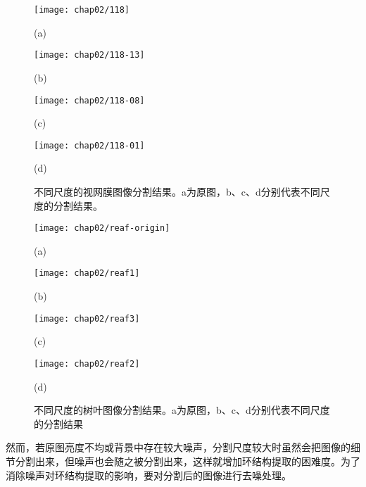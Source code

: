 \begin{figure}
\centering
  \begin{minipage}[b]{0.48\textwidth} 
      \centering 
      \texttt{[image: chap02/118]}
        \centerline{(a)}\medskip
  \label{Segmentaion-retinal:a}
    \end{minipage}
  \begin{minipage}[b]{0.48\textwidth}
    \centering
    \texttt{[image: chap02/118-13]}
      \centerline{(b)}\medskip
   \label{Segmentaion-retinal:b}
  \end{minipage}
  \begin{minipage}[b]{0.48\textwidth}
    \centering
    \texttt{[image: chap02/118-08]}
      \centerline{(c)}\medskip
     \label{Segmentaion-retinal:c}
  \end{minipage}
  \begin{minipage}[b]{0.48\textwidth}
    \centering
    \texttt{[image: chap02/118-01]}
      \centerline{(d)}\medskip
	   \label{Segmentaion-retinal:d}
  \end{minipage}
\caption{不同尺度的视网膜图像分割结果。a为原图，b、c、d分别代表不同尺度的分割结果。}
\label{fig:Segmentaion-retinal}
\end{figure}

\begin{figure}
\centering
  \begin{minipage}[b]{0.48\textwidth} 
      \centering 
      \texttt{[image: chap02/reaf-origin]}
        \centerline{(a)}\medskip
    \end{minipage}
  \begin{minipage}[b]{0.48\textwidth}
    \centering
    \texttt{[image: chap02/reaf1]}
      \centerline{(b)}\medskip
  \end{minipage}
  \begin{minipage}[b]{0.48\textwidth}
    \centering
    \texttt{[image: chap02/reaf3]}
      \centerline{(c)}\medskip
  \end{minipage}
  \begin{minipage}[b]{0.48\textwidth}
    \centering
    \texttt{[image: chap02/reaf2]}
      \centerline{(d)}\medskip
	\label{fig:max}
  \end{minipage}
\caption{不同尺度的树叶图像分割结果。a为原图，b、c、d分别代表不同尺度的分割结果}
\label{fig:Segmentaion-retinal1}
\end{figure}

然而，若原图亮度不均或背景中存在较大噪声，分割尺度较大时虽然会把图像的细节分割出来，但噪声也会随之被分割出来，这样就增加环结构提取的困难度。为了消除噪声对环结构提取的影响，要对分割后的图像进行去噪处理。

